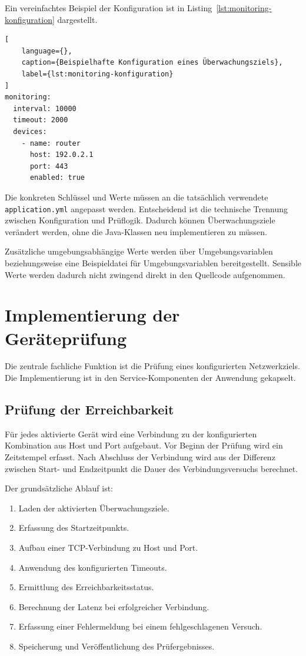 Ein vereinfachtes Beispiel der Konfiguration ist in Listing~\ref{lst:monitoring-konfiguration} dargestellt.

\begin{lstlisting}[
    language={},
    caption={Beispielhafte Konfiguration eines Überwachungsziels},
    label={lst:monitoring-konfiguration}
]
monitoring:
  interval: 10000
  timeout: 2000
  devices:
    - name: router
      host: 192.0.2.1
      port: 443
      enabled: true
\end{lstlisting}

Die konkreten Schlüssel und Werte müssen an die tatsächlich verwendete \texttt{application.yml} angepasst werden. Entscheidend ist die technische Trennung zwischen Konfiguration und Prüflogik. Dadurch können Überwachungsziele verändert werden, ohne die Java-Klassen neu implementieren zu müssen.

Zusätzliche umgebungsabhängige Werte werden über Umgebungsvariablen beziehungsweise eine Beispieldatei für Umgebungsvariablen bereitgestellt. Sensible Werte werden dadurch nicht zwingend direkt in den Quellcode aufgenommen.

\section{Implementierung der Geräteprüfung}
\label{sec:implementierung-geraetepruefung}

Die zentrale fachliche Funktion ist die Prüfung eines konfigurierten Netzwerkziels. Die Implementierung ist in den Service-Komponenten der Anwendung gekapselt.

\subsection{Prüfung der Erreichbarkeit}
\label{subsec:pruefung-erreichbarkeit}

Für jedes aktivierte Gerät wird eine Verbindung zu der konfigurierten Kombination aus Host und Port aufgebaut. Vor Beginn der Prüfung wird ein Zeitstempel erfasst. Nach Abschluss der Verbindung wird aus der Differenz zwischen Start- und Endzeitpunkt die Dauer des Verbindungsversuchs berechnet.

Der grundsätzliche Ablauf ist:

\begin{enumerate}
    \item Laden der aktivierten Überwachungsziele.
    \item Erfassung des Startzeitpunkts.
    \item Aufbau einer TCP-Verbindung zu Host und Port.
    \item Anwendung des konfigurierten Timeouts.
    \item Ermittlung des Erreichbarkeitsstatus.
    \item Berechnung der Latenz bei erfolgreicher Verbindung.
    \item Erfassung einer Fehlermeldung bei einem fehlgeschlagenen Versuch.
    \item Speicherung und Veröffentlichung des Prüfergebnisses.
\end{enumerate}


